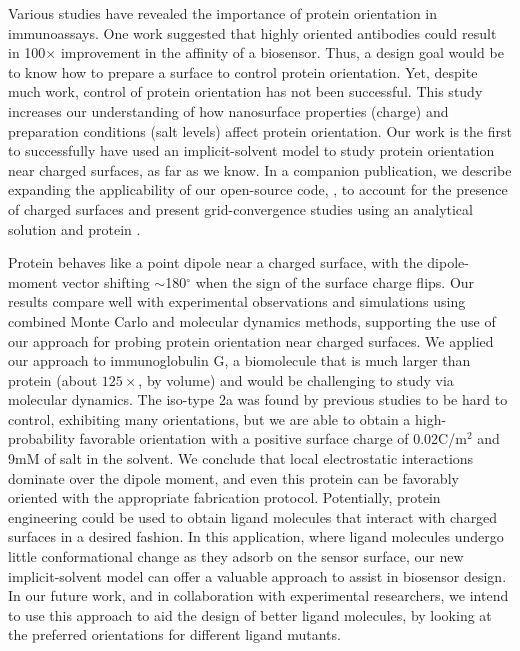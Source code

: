 
Various studies have revealed the importance of protein orientation in immunoassays. One work suggested that highly oriented antibodies could result in 100$\times$ improvement in the affinity of a biosensor.\cite{TajimaTakaiIshihara2011} Thus, a design goal would be to know how to prepare a surface to control protein orientation. Yet, despite much work, control of protein orientation has not been successful.
This study increases our understanding of how nanosurface properties (charge) and preparation conditions (salt levels) affect protein orientation.
Our work is the first to successfully have used an implicit-solvent model to study protein orientation near charged surfaces, as far as we know. In a companion publication,\cite{CooperBarba2015a} we describe expanding the applicability of our open-source code, \pygbe, to account for the presence of charged surfaces and present grid-convergence studies using an analytical solution and protein \gb. 

Protein \gb behaves like a point dipole near a charged surface, with the dipole-moment vector shifting $\sim$180$^\circ$ when the sign of the surface charge flips. Our results compare well with experimental observations and simulations using combined Monte Carlo and molecular dynamics methods, supporting the use of our approach for probing protein orientation near charged surfaces.
We applied our approach to immunoglobulin G, a biomolecule that is much larger than protein \gb (about $125\times$, by volume) and would be challenging  to study via molecular dynamics. 
The iso-type \ig 2a was found by previous studies to be hard to control, exhibiting many orientations, but we are able to obtain a high-probability favorable orientation with a positive surface charge of 0.02C/m$^{2}$ and 9mM of salt in the solvent. We conclude that local electrostatic interactions dominate over the dipole moment, and even this protein can be favorably oriented with the appropriate fabrication protocol. Potentially, protein engineering could be used to obtain ligand molecules that interact with charged surfaces in a desired fashion.
In this application, where ligand molecules undergo little conformational change as they adsorb on the sensor surface, our new implicit-solvent model can offer a valuable approach to assist in biosensor design. In our future work, and in collaboration with experimental researchers, we intend to use this approach to aid the design of better ligand molecules, by looking at the preferred orientations for different ligand mutants. 
